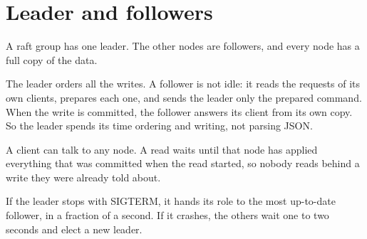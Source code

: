 
\section{Leader and followers}

A raft group has one leader. The other nodes are followers, and every node has a full copy of the
data.

The leader orders all the writes. A follower is not idle: it reads the requests of its own
clients, prepares each one, and sends the leader only the prepared command. When the write is
committed, the follower answers its client from its own copy. So the leader spends its time
ordering and writing, not parsing JSON.


A client can talk to any node. A read waits until that node has applied everything that was
committed when the read started, so nobody reads behind a write they were already told about.

If the leader stops with SIGTERM, it hands its role to the most up-to-date follower, in a fraction
of a second. If it crashes, the others wait one to two seconds and elect a new leader.
